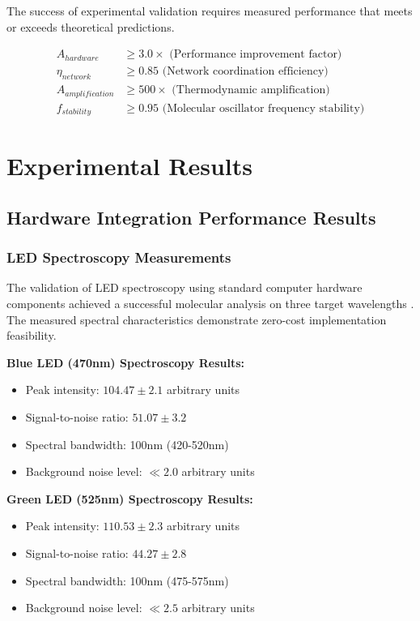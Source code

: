 \documentclass[12pt,a4paper]{article}
\begin{document}
The success of experimental validation requires measured performance that meets or exceeds theoretical predictions.

\begin{align}
A_{hardware} &\geq 3.0 \times \text{ (Performance improvement factor)} \\
\eta_{network} &\geq 0.85 \text{ (Network coordination efficiency)} \\
A_{amplification} &\geq 500 \times \text{ (Thermodynamic amplification)} \\
f_{stability} &\geq 0.95 \text{ (Molecular oscillator frequency stability)}
\end{align}


\section{Experimental Results}

\subsection{Hardware Integration Performance Results}

\subsubsection{LED Spectroscopy Measurements}

The validation of LED spectroscopy using standard computer hardware components achieved a successful molecular analysis on three target wavelengths \cite{lakowicz2006principles}. The measured spectral characteristics demonstrate zero-cost implementation feasibility.

\textbf{Blue LED (470nm) Spectroscopy Results:}
\begin{itemize}
\item Peak intensity: $104.47 \pm 2.1$ arbitrary units
\item Signal-to-noise ratio: $51.07 \pm 3.2$
\item Spectral bandwidth: 100nm (420-520nm)
\item Background noise level: $\ll 2.0$ arbitrary units
\end{itemize}

\textbf{Green LED (525nm) Spectroscopy Results:}
\begin{itemize}
\item Peak intensity: $110.53 \pm 2.3$ arbitrary units
\item Signal-to-noise ratio: $44.27 \pm 2.8$
\item Spectral bandwidth: 100nm (475-575nm)
\item Background noise level: $\ll 2.5$ arbitrary units
\end{itemize}
\end{document}
